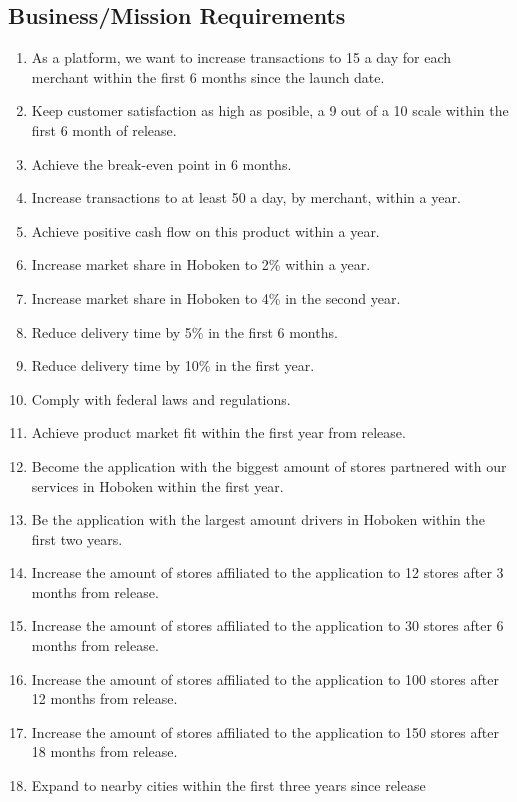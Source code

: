\subsection{Business/Mission Requirements}
\begin{enumerate}[label=BR-\arabic*]
    \item As a platform, we want to increase transactions to 15 a day for each 
    merchant within the first 6 months since the launch date.
    \item Keep customer satisfaction as high as posible, a 9 out of a 10 scale 
    within the first 6 month of release.
    \item Achieve the break-even point in 6 months.
    \item Increase transactions to at least 50 a day, by merchant, within 
    a year.
    \item Achieve positive cash flow on this product within a year.
    \item Increase market share in Hoboken to 2\% within a year.
    \item Increase market share in Hoboken to 4\% in the second year.
    \item Reduce delivery time by 5\% in the first 6 months.
    \item Reduce delivery time by 10\% in the first year.
    \item Comply with federal laws and regulations.
    \item Achieve product market fit \cite{product-market-fit} within the first 
    year from release.
    \item Become the application with the biggest amount of stores partnered 
    with our services in Hoboken within the first year.
    \item Be the application with the largest amount drivers in Hoboken 
    within the first two years.
    \item Increase the amount of stores affiliated to the application to 12 
    stores after 3 months from release.
    \item Increase the amount of stores affiliated to the application to 30 
    stores after 6 months from release.
    \item Increase the amount of stores affiliated to the application to 100 
    stores after 12 months from release.
    \item Increase the amount of stores affiliated to the application to 150 
    stores after 18 months from release.
    \item Expand to nearby cities within the first three years since release

\end{enumerate}
